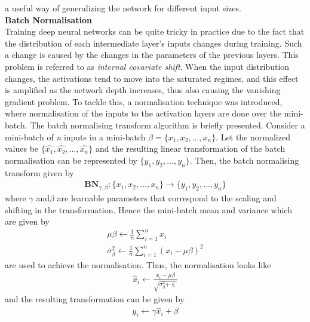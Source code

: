 \begin{enumerate}
                    a useful way of generalizing the network for different input sizes. \\ 
                    \vspace{3mm} 
                    \textbf{Batch Normalisation} \\ 
                    \vspace{3mm}
                    Training deep neural networks can be quite tricky in practice due to the fact that
                    the distribution of each intermediate layer’s inputs changes during training. Such a
                    change is caused by the changes in the parameters of the previous layers. This problem is referred to as \emph{internal covariate shift}. When the input distribution changes,
                    the activations tend to move into the saturated regimes, and this effect is amplified
                    as the network depth increases, thus also causing the vanishing gradient problem.
                    To tackle this, a normalisation technique was introduced, where normalisation of the inputs to the activation layers are done over the mini-batch. The batch
                    normalising transform algorithm is briefly presented. Consider a mini-batch of \emph{n} inputs in a mini-batch \textbf{$\beta = \{x_1,x_2,...,x_n\}$}. Let 
                    the normalized values be $\{\hat{x_1},\hat{x_2},...,\hat{x_n}\}$ and the resulting linear transformation of the batch 
                    normalisation can be represented by $\{y_1,y_2,...,y_n\}$. Then, the batch normalising transform given by 
                    \begin{align}
                        \textbf{BN}_{\gamma,\beta} : \{x_1,x_2,...,x_n\} \rightarrow \{y_1,y_2,...,y_n\}
                    \end{align}
                    where $\gamma$ and$\beta$ are learnable parameters that correspond to the scaling and shifting
                    in the transformation. Hence the mini-batch mean and variance which are given by 
                    \begin{align}
                        \mu \beta \leftarrow \frac{1}{n} \displaystyle\sum_{i=1}^n x_i \\
                        \sigma_\beta^2 \leftarrow \frac{1}{n} \displaystyle\sum_{i=1}^n (x_i - \mu \beta)^2
                    \end{align}
                    are used to achieve the normalisation. Thus, the normalisation looks like
                    \begin{align}
                        \hat{x}_i \leftarrow \frac{x_i - \mu \beta}{\sqrt{\sigma_\beta^2 + \in}}
                    \end{align}
                    and the resulting transformation can be given by
                    \begin{align}
                        y_i \leftarrow \gamma \hat{x}_i + \beta
                    \end{align}
            \end{enumerate}

